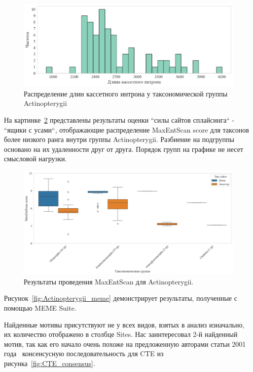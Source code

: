 \begin{figure}[h] %
    \centering
    \includegraphics[width=1.0\textwidth]{images/Actinopterygii_intron}
    \caption{Распределение длин кассетного интрона у таксономической группы Actinopterygii}
    \label{fig:Actinopterygii_intron}
\end{figure}


На картинке~\ref{fig:Actinopterygii_maxentscan} представлены результаты оценки ``силы сайтов сплайсинга`` - ``ящики с усами``, отображающие распределение MaxEntScan score для таксонов более низкого ранга внутри группы Actinopterygii.
Разбиение на подгруппы основано на их удаленности друг от друга.
Порядок групп на графике не несет смысловой нагрузки.

\begin{figure}[h] %
    \centering
    \includegraphics[width=1.0\textwidth]{images/Actinopterygii_maxentscan}
    \caption{Результаты проведения MaxEntScan для Actinopterygii.}
    \label{fig:Actinopterygii_maxentscan}
\end{figure}


Рисунок~\ref{fig:Actinopterygii_meme} демонстрирует результаты, полученные с помощью MEME Suite.

Найденные мотивы присутствуют не у всех видов, взятых в анализ изначально, их количество отображено в столбце Sites.
Нас заинтересовал 2-й найденный мотив, так как его начало очень похоже на предложенную авторами статьи 2001 года~\cite{cte_consensus} консенсусную последовательность для CTE из рисунка~\ref{fig:CTE_consensus}.

